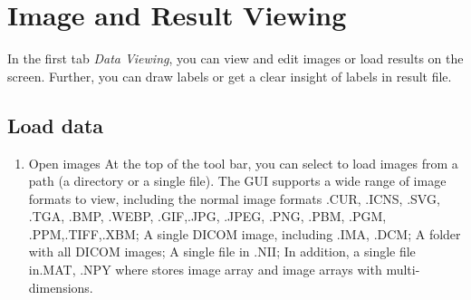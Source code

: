 \documentclass[12pt]{article}
\begin{document}
\graphicspath{ {images/} }
\section*{Image and Result Viewing}

In the first tab \textit{Data Viewing}, you can view and edit images or load results on the screen. Further, you can draw labels or get a clear insight of labels in result file.
\subsection{Load data}
\begin{enumerate}
	\item Open images
	\newline At the top of the tool bar, you can select to load images from a path (a directory or a single file). The GUI supports a wide range of image formats to view, including the normal image formats .CUR, .ICNS, .SVG, .TGA, .BMP, .WEBP, .GIF,.JPG, .JPEG, .PNG, .PBM, .PGM, .PPM,.TIFF,.XBM; A single DICOM image, including .IMA, .DCM; A folder with all DICOM images; A single file in .NII; In addition, a single file in.MAT, .NPY where stores image array                                                                                                                                                                                                                                                                               and image arrays with multi-dimensions.
	

\end{enumerate}
\end{document}
